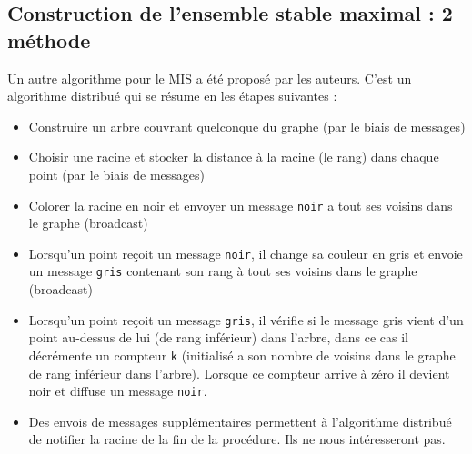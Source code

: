 \subsection{Construction de l'ensemble stable maximal : 2 méthode}
Un autre algorithme pour le MIS a été proposé par les auteurs. C'est un algorithme distribué qui se résume en les étapes suivantes :
\begin{itemize}
\item Construire un arbre couvrant quelconque du graphe (par le biais de messages)
\item Choisir une racine et stocker la distance à la racine (le rang) dans chaque point (par le biais de messages)
\item Colorer la racine en noir et envoyer un message \verb?noir? a tout ses voisins dans le graphe (broadcast)
\item Lorsqu'un point reçoit un message \verb?noir?, il change sa couleur en gris et envoie un message \verb?gris? contenant son rang à tout ses voisins dans le graphe (broadcast)
\item Lorsqu'un point reçoit un message \verb?gris?, il vérifie si le message gris vient d'un point au-dessus de lui (de rang inférieur) dans l'arbre, dans ce cas il décrémente un compteur \verb?k? (initialisé a son nombre de voisins dans le graphe de rang inférieur dans l'arbre). Lorsque ce compteur arrive à zéro il devient noir et diffuse un message \verb?noir?.
\item Des envois de messages supplémentaires permettent à l'algorithme distribué de notifier la racine de la fin de la procédure. Ils ne nous intéresseront pas.
\end{itemize}

